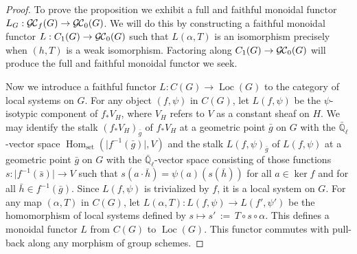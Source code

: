 \documentclass[11pt]{amsart}
\theoremstyle{plain}
\theoremstyle{definition}
\theoremstyle{remark}
\newcommand{\EE}{\mathbb{\bar Q}_\ell}
\DeclareMathOperator{\Hom}{Hom}
\newcommand{\abs}[1]{{\vert #1 \vert}}
\newcommand{\ceq}{{\, :=\, }}
\newcommand{\GC}{{\mathcal{G\hskip-0.8pt C}}}
\newcommand{\GCb}{{\GC_0}}
\newcommand{\GCf}{{\GC_f}}
\newcommand{\Loc}{{\operatorname{Loc}}}
\begin{document}
\begin{proof}
 To prove the proposition we exhibit a full and faithful monoidal functor $L_G : \GCf(G) \to \GCb(G)$.
 We will do this by constructing a faithful monoidal functor $L : C_1(G) \to \GCb(G)$ 
 such that $L(\alpha,T)$ is an isomorphism precisely when $(h,T)$ is a weak isomorphism. 
 Factoring along $C_1(G) \to \GCb(G)$ will produce the full and faithful monoidal functor we seek.

 Now we introduce a faithful functor $L : C(G) \to \Loc(G)$ to the category of local systems on $G$.
 For any object $(f,\psi)$ in $C(G)$, let $L(f,\psi)$ be the $\psi$-isotypic component of $f_* V_H$, 
 where $V_H$ refers to $V$ as a constant sheaf on $H$. 
 We may identify the stalk $(f_* V_H)_{\bar g}$ of $f_* V_H$ at a geometric point ${\bar g}$ on $G$ 
 with the $\EE$-vector space $\Hom_\text{set}(\abs{f^{-1}({\bar g})},V)$ 
 and the stalk $L(f,\psi)_{\bar g}$ of $L(f,\psi)$ at a geometric point ${\bar g}$ on $G$ 
 with the $\EE$-vector space consisting of those functions $s: \abs{f^{-1}({\bar s})} \to V$ such that 
 $s(a\cdot {\bar h}) = \psi(a)(s({\bar h}))$ for all $a\in \ker f$ and for all ${\bar h} \in f^{-1}({\bar g})$.
 Since $L(f,\psi)$ is trivialized by $f$, it is a local system on $G$.
 For any map $(\alpha,T)$ in $C(G)$, let $L(\alpha,T) : L(f,\psi) \to L(f',\psi')$ be the homomorphism of local systems defined 
 by $s \mapsto s' \ceq T\circ s\circ \alpha$. 
 This defines a monoidal functor $L$ from $C(G)$ to $\Loc(G)$. 
 This functor commutes with pull-back along any morphism of group schemes.
  

\end{proof}
\end{document}
